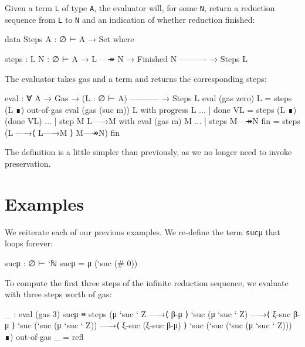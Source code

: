Given a term \texttt{L} of type \texttt{A}, the evaluator will, for some
\texttt{N}, return a reduction sequence from \texttt{L} to \texttt{N}
and an indication of whether reduction finished:

\begin{fence}
\begin{code}
data Steps {A} : ∅ ⊢ A → Set where

  steps : {L N : ∅ ⊢ A}
    → L —↠ N
    → Finished N
      ----------
    → Steps L
\end{code}
\end{fence}

The evaluator takes gas and a term and returns the corresponding steps:

\begin{fence}
\begin{code}
eval : ∀ {A}
  → Gas
  → (L : ∅ ⊢ A)
    -----------
  → Steps L
eval (gas zero)    L                     =  steps (L ∎) out-of-gas
eval (gas (suc m)) L with progress L
... | done VL                            =  steps (L ∎) (done VL)
... | step {M} L—→M with eval (gas m) M
...    | steps M—↠N fin                  =  steps (L —→⟨ L—→M ⟩ M—↠N) fin
\end{code}
\end{fence}

The definition is a little simpler than previously, as we no longer need
to invoke preservation.

\hypertarget{examples-1}{%
\section{Examples}\label{examples-1}}

We reiterate each of our previous examples. We re-define the term
\texttt{sucμ} that loops forever:

\begin{fence}
\begin{code}
sucμ : ∅ ⊢ `ℕ
sucμ = μ (`suc (# 0))
\end{code}
\end{fence}

To compute the first three steps of the infinite reduction sequence, we
evaluate with three steps worth of gas:

\begin{fence}
\begin{code}
_ : eval (gas 3) sucμ ≡
  steps
   (μ `suc ` Z
   —→⟨ β-μ ⟩
    `suc (μ `suc ` Z)
   —→⟨ ξ-suc β-μ ⟩
    `suc (`suc (μ `suc ` Z))
   —→⟨ ξ-suc (ξ-suc β-μ) ⟩
    `suc (`suc (`suc (μ `suc ` Z)))
   ∎)
   out-of-gas
_ = refl
\end{code}
\end{fence}


